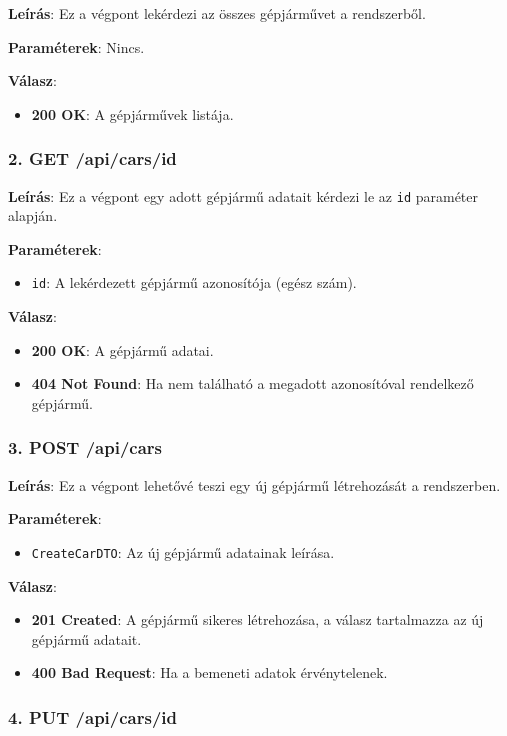 \documentclass{report}[11pt]
\begin{document}
\textbf{Leírás}:  
Ez a végpont lekérdezi az összes gépjárművet a rendszerből.

\textbf{Paraméterek}:  
Nincs.

\textbf{Válasz}:  
\begin{itemize}
    \item \textbf{200 OK}: A gépjárművek listája.
\end{itemize}

\subsubsection{2. GET /api/cars/{id}}

\textbf{Leírás}:  
Ez a végpont egy adott gépjármű adatait kérdezi le az \texttt{id} paraméter alapján.

\textbf{Paraméterek}:  
\begin{itemize}
    \item \texttt{id}: A lekérdezett gépjármű azonosítója (egész szám).
\end{itemize}

\textbf{Válasz}:  
\begin{itemize}
    \item \textbf{200 OK}: A gépjármű adatai.
    \item \textbf{404 Not Found}: Ha nem található a megadott azonosítóval rendelkező gépjármű.
\end{itemize}

\subsubsection{3. POST /api/cars}

\textbf{Leírás}:  
Ez a végpont lehetővé teszi egy új gépjármű létrehozását a rendszerben.

\textbf{Paraméterek}:  
\begin{itemize}
    \item \texttt{CreateCarDTO}: Az új gépjármű adatainak leírása.
\end{itemize}

\textbf{Válasz}:  
\begin{itemize}
    \item \textbf{201 Created}: A gépjármű sikeres létrehozása, a válasz tartalmazza az új gépjármű adatait.
    \item \textbf{400 Bad Request}: Ha a bemeneti adatok érvénytelenek.
\end{itemize}

\subsubsection{4. PUT /api/cars/{id}}
\end{document}
